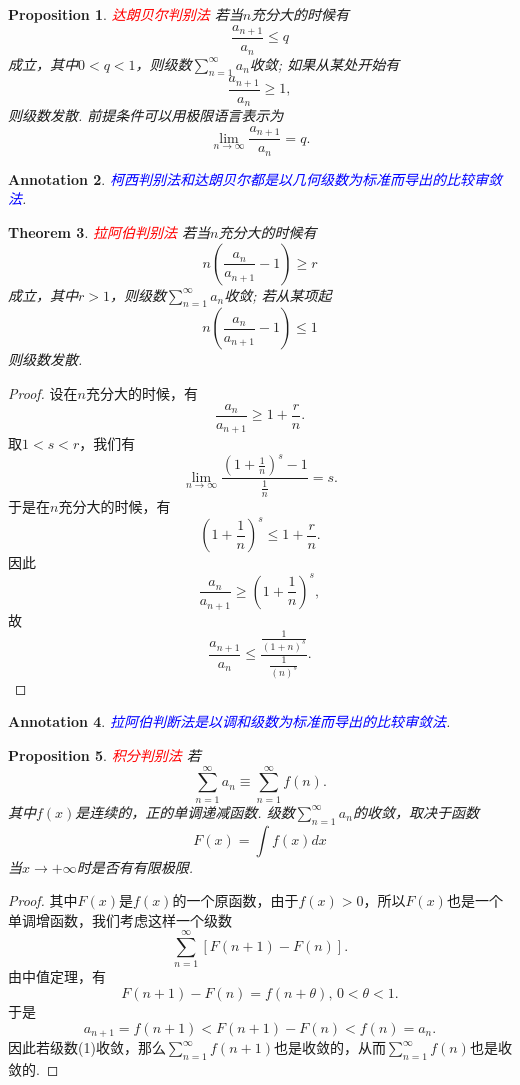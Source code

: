 \documentclass{article}
\newtheorem{theorem}{Theorem}[section]
\newtheorem{proposition}[theorem]{Proposition}
\newtheorem{annotation}[theorem]{Annotation}
\newcommand{\redt}[1]{\textcolor{red}{#1}}
\newcommand{\bluet}[1]{\textcolor{blue}{#1}}
\begin{document}
\begin{proposition}
\rm \redt{达朗贝尔判别法} 若当$n$充分大的时候有
$$
\frac{a_{n+1}}{a_n} \leq q
$$
成立，其中$0 < q <1$，则级数$\sum\limits_{n=1}^\infty a_n$收敛; 如果从某处开始有
$$
\frac{a_{n+1}}{a_n} \geq 1,
$$
则级数发散. 前提条件可以用极限语言表示为
$$
\lim\limits_{n \to \infty} \frac{a_{n+1}}{a_n} = q.
$$
\end{proposition}

\begin{annotation}
\rm \bluet{柯西判别法和达朗贝尔都是以几何级数为标准而导出的比较审敛法}.
\end{annotation}

\begin{theorem}
\rm \redt{拉阿伯判别法} 若当$n$充分大的时候有
$$
n\left( \frac{a_n}{a_{n+1}} - 1\right) \geq r
$$
成立，其中$r > 1$，则级数$\sum\limits_{n=1}^\infty a_n$收敛; 若从某项起
$$
n\left( \frac{a_n}{a_{n+1}} - 1\right) \leq 1
$$
则级数发散. 
\end{theorem}

\begin{proof}
设在$n$充分大的时候，有
$$
\frac{a_n}{a_{n+1}} \geq  1 + \frac{r}{n}.
$$
取$1< s < r$，我们有
$$
\lim\limits_{n \to \infty} \frac{(1+\frac{1}{n})^s-1}{\frac{1}{n}} = s.
$$
于是在$n$充分大的时候，有
$$
(1+\frac{1}{n})^s \leq 1+\frac{r}{n}. 
$$
因此
$$
\frac{a_n}{a_{n+1}} \geq (1+\frac{1}{n})^s,
$$
故
$$
\frac{a_{n+1}}{a_n} \leq \frac{\frac{1}{(1+n)^s}}{\frac{1}{(n)^s}}.
$$
\end{proof}

\begin{annotation}
\rm \bluet{拉阿伯判断法是以调和级数为标准而导出的比较审敛法}.
\end{annotation}

\begin{proposition}
\rm \redt{积分判别法} 若
$$
\sum\limits_{n=1}^\infty a_n \equiv \sum\limits_{n=1}^\infty f(n).
$$
其中$f(x)$是连续的，正的单调递减函数. 级数$\sum\limits_{n=1}^\infty a_n$的收敛，取决于函数
$$
F(x) = \int f(x)dx
$$
当$x \to +\infty$时是否有有限极限. 
\end{proposition}

\begin{proof}
其中$F(x)$是$f(x)$的一个原函数，由于$f(x) > 0$，所以$F(x)$也是一个单调增函数，我们考虑这样一个级数
\begin{equation}
\sum\limits_{n=1}^{\infty} \left[F(n+1)-F(n)\right].
\end{equation}
由中值定理，有
$$
F(n+1)-F(n) = f(n+\theta),\, 0 < \theta < 1.
$$
于是
$$
a_{n+1} = f(n+1) < F(n+1)-F(n) < f(n)=a_n. 
$$
因此若级数(1)收敛，那么$\sum\limits_{n=1}^{\infty}f(n+1)$也是收敛的，从而$\sum\limits_{n=1}^{\infty}f(n)$也是收敛的. 
\end{proof}
\end{document}
